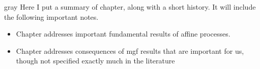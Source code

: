 \begin{color}{gray}
  Here I put a summary of chapter, along with a short history.
  It will include the following important notes.
  \begin{itemize}
    \item
      Chapter addresses important fundamental results of affine processes.
    \item
      Chapter addresses consequences of mgf results that are important for us, though not specified exactly much in the literature
  \end{itemize}
\end{color}
